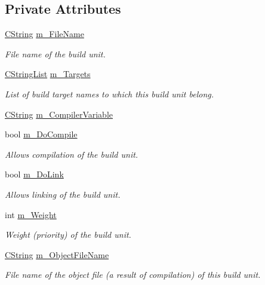\subsection*{Private Attributes}
\begin{DoxyCompactItemize}
\item 
\hyperlink{classCString}{C\-String} \hyperlink{classCBuildUnit_a5ad43c7517f4f80499ff21daf294d967}{m\-\_\-\-File\-Name}
\begin{DoxyCompactList}\small\item\em File name of the build unit. \end{DoxyCompactList}\item 
\hyperlink{classCStringList}{C\-String\-List} \hyperlink{classCBuildUnit_a7de33cce470e64171c8bdbb502dd5395}{m\-\_\-\-Targets}
\begin{DoxyCompactList}\small\item\em List of build target names to which this build unit belong. \end{DoxyCompactList}\item 
\hyperlink{classCString}{C\-String} \hyperlink{classCBuildUnit_ae8ffef7689a48215b7c98ce2ba7edada}{m\-\_\-\-Compiler\-Variable}
\item 
bool \hyperlink{classCBuildUnit_afc82990203560d45c4e00d451ffee977}{m\-\_\-\-Do\-Compile}
\begin{DoxyCompactList}\small\item\em Allows compilation of the build unit. \end{DoxyCompactList}\item 
bool \hyperlink{classCBuildUnit_a26d55f28bb6566143aaabb61c4fe93d4}{m\-\_\-\-Do\-Link}
\begin{DoxyCompactList}\small\item\em Allows linking of the build unit. \end{DoxyCompactList}\item 
int \hyperlink{classCBuildUnit_aae6c75ed4d916241e1daf249425b5dc5}{m\-\_\-\-Weight}
\begin{DoxyCompactList}\small\item\em Weight (priority) of the build unit. \end{DoxyCompactList}\item 
\hyperlink{classCString}{C\-String} \hyperlink{classCBuildUnit_a890c7a9cef4689007e45631c01069fc5}{m\-\_\-\-Object\-File\-Name}
\begin{DoxyCompactList}\small\item\em File name of the object file (a result of compilation) of this build unit. \end{DoxyCompactList}\end{DoxyCompactItemize}
